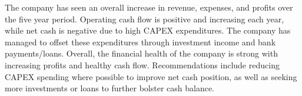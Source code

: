 

The company has seen an overall increase in revenue, expenses, and profits over the five year period. Operating cash flow is positive and increasing each year, while net cash is negative due to high CAPEX expenditures. The company has managed to offset these expenditures through investment income and bank payments/loans. Overall, the financial health of the company is strong with increasing profits and healthy cash flow. Recommendations include reducing CAPEX spending where possible to improve net cash position, as well as seeking more investments or loans to further bolster cash balance.